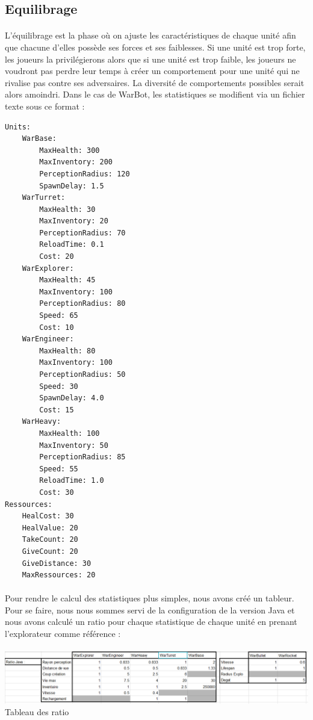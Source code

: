 \documentclass{report}
\begin{document}
\subsection{Equilibrage}
\paragraph{}
    L’équilibrage est la phase où on ajuste les caractéristiques de chaque unité afin que chacune d’elles possède ses forces et ses faiblesses. Si une unité est trop forte, les joueurs la privilégierons alors que si une unité est trop faible, les joueurs ne voudront pas perdre leur temps à créer un comportement pour une unité qui ne rivalise pas contre ses adversaires. La diversité de comportements possibles serait alors amoindri. \newline
    Dans le cas de WarBot, les statistiques se modifient via un fichier texte sous ce format :
\begin{lstlisting}[frame=single]
Units:
    WarBase:
        MaxHealth: 300
        MaxInventory: 200
        PerceptionRadius: 120
        SpawnDelay: 1.5
    WarTurret:
        MaxHealth: 30
        MaxInventory: 20
        PerceptionRadius: 70
        ReloadTime: 0.1
        Cost: 20
    WarExplorer:
        MaxHealth: 45
        MaxInventory: 100
        PerceptionRadius: 80
        Speed: 65
        Cost: 10
    WarEngineer:
        MaxHealth: 80
        MaxInventory: 100
        PerceptionRadius: 50
        Speed: 30
        SpawnDelay: 4.0
        Cost: 15
    WarHeavy:
        MaxHealth: 100
        MaxInventory: 50
        PerceptionRadius: 85
        Speed: 55
        ReloadTime: 1.0
        Cost: 30
Ressources:
    HealCost: 30
    HealValue: 20
    TakeCount: 20
    GiveCount: 20
    GiveDistance: 30
    MaxRessources: 20
\end{lstlisting}
\paragraph{}
Pour rendre le calcul des statistiques plus simples, nous avons créé un tableur. Pour se faire, nous nous sommes servi de la configuration de la version Java et nous avons calculé un ratio pour chaque statistique de chaque unité en prenant l’explorateur comme référence :

\paragraph{}
\begin{adjustwidth}{-2em}{}
\includegraphics[scale=0.5]{DATA/ratio.png}
 {Tableau des ratio}
\end{adjustwidth}
\end{document}
